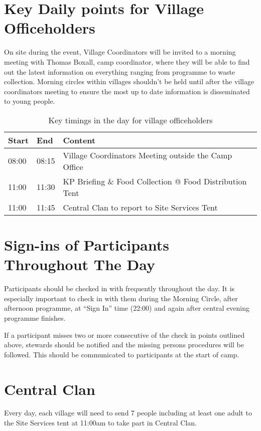 \documentclass[a4paper, 11pt]{report}
\begin{document}
\section{Key Daily points for Village Officeholders}
On site during the event, Village Coordinators will be invited to a morning meeting with Thomas Boxall, camp coordinator, where they will be able to find out the latest information on everything ranging from programme to waste collection. Morning circles within villages shouldn't be held until after the village coordinators meeting to ensure the most up to date information is disseminated to young people. 
\begin{table}[H]
    \centering
    {\RaggedRight
    \begin{tabular}{p{} p{} p{}}
        \textbf{Start} & \textbf{End} & \textbf{Content} \\
        \hline
        08:00 & 08:15 & Village Coordinators Meeting outside the Camp Office \\
        \hline
        11:00 & 11:30 & KP Briefing \& Food Collection @ Food Distribution Tent \\
        \hline
        11:00 & 11:45 & Central Clan to report to Site Services Tent\\
        \hline
    \end{tabular}
    }%
    \caption{Key timings in the day for village officeholders}
\end{table}

\section{Sign-ins of Participants Throughout The Day}
Participants should be checked in with frequently throughout the day. It is especially important to check in with them during the Morning Circle, after afternoon programme, at “Sign In” time (22:00) and again after central evening programme finishes. \nl

If a participant misses two or more consecutive of the check in points outlined above, stewards should be notified and the missing persons procedures will be followed. This should be communicated to participants at the start of camp.

\section{Central Clan}
Every day, each village will need to send 7 people including at least one adult to the Site Services tent at 11:00am to take part in Central Clan.\nl
\end{document}
